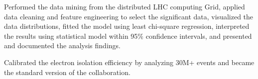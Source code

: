 \documentclass[letterpaper]{deedy-resume-openfont}
\begin{document}
\begin{tightemize}
\item Performed the data mining from the distributed LHC computing Grid, applied data cleaning and feature engineering to select the significant data, visualized the data distributions, fitted the model using least chi-square regression, interpreted the results using statistical model within 95\% confidence intervals, and presented and documented the analysis findings.
\item Calibrated the electron isolation efficiency by analyzing 30M+ events and became the standard version of the collaboration. %



\end{tightemize}
\end{document}
